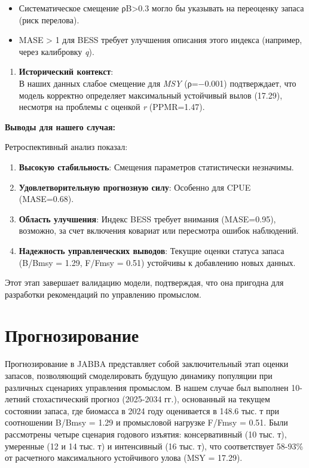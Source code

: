 \documentclass[
  letterpaper,
  DIV=11,
  numbers=noendperiod]{scrreprt}
\providecommand{\tightlist}{%
  \setlength{\itemsep}{0pt}\setlength{\parskip}{0pt}}
\begin{document}
\begin{itemize}
\tightlist
\item
  Систематическое смещение ρB\textgreater0.3 могло бы указывать на
  переоценку запаса (риск перелова).
\item
  MASE \textgreater{} 1 для BESS требует улучшения описания этого
  индекса (например, через калибровку \emph{q}).
\end{itemize}

\begin{enumerate}
\def\labelenumi{\arabic{enumi}.}
\setcounter{enumi}{2}
\tightlist
\item
  \textbf{Исторический контекст}:\\
  В наших данных слабое смещение для \emph{MSY} (ρ=−0.001) подтверждает,
  что модель корректно определяет максимальный устойчивый вылов (17.29),
  несмотря на проблемы с оценкой \emph{r} (PPMR=1.47).
\end{enumerate}

\textbf{Выводы для нашего случая:}

Ретроспективный анализ показал:

\begin{enumerate}
\def\labelenumi{\arabic{enumi}.}
\tightlist
\item
  \textbf{Высокую стабильность}: Смещения параметров статистически
  незначимы.
\item
  \textbf{Удовлетворительную прогнозную силу}: Особенно для CPUE
  (MASE=0.68).
\item
  \textbf{Область улучшения}: Индекс BESS требует внимания (MASE=0.95),
  возможно, за счет включения ковариат или пересмотра ошибок наблюдений.
\item
  \textbf{Надежность управленческих выводов}: Текущие оценки статуса
  запаса (B/Bmsy = 1.29, F/Fmsy = 0.51) устойчивы к добавлению новых
  данных.
\end{enumerate}

Этот этап завершает валидацию модели, подтверждая, что она пригодна для
разработки рекомендаций по управлению промыслом.

\section{Прогнозирование}\label{ux43fux440ux43eux433ux43dux43eux437ux438ux440ux43eux432ux430ux43dux438ux435}

Прогнозирование в JABBA представляет собой заключительный этап оценки
запасов, позволяющий смоделировать будущую динамику популяции при
различных сценариях управления промыслом. В нашем случае был выполнен
10-летний стохастический прогноз (2025-2034 гг.), основанный на текущем
состоянии запаса, где биомасса в 2024 году оценивается в 148.6 тыс. т
при соотношении B/Bmsy = 1.29 и промысловой нагрузке F/Fmsy = 0.51. Были
рассмотрены четыре сценария годового изъятия: консервативный (10 тыс.
т), умеренные (12 и 14 тыс. т) и интенсивный (16 тыс. т), что
соответствует 58-93\% от расчетного максимального устойчивого улова (MSY
= 17.29).
\end{document}
